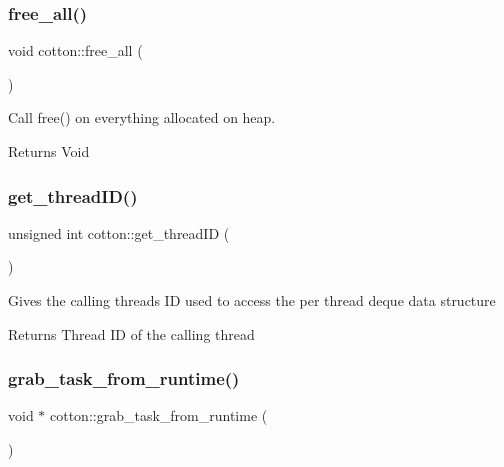 \subsubsection{\texorpdfstring{free\+\_\+all()}{free\_all()}}
{\footnotesize\ttfamily void cotton\+::free\+\_\+all (\begin{DoxyParamCaption}{ }\end{DoxyParamCaption})}

Call free() on everything allocated on heap.

\begin{DoxyReturn}{Returns}
Void 
\end{DoxyReturn}
\mbox{\label{cotton-runtime_8h_file_ab1ebe1f6821a54e7c4911c22acebff8a}} 
\subsubsection{\texorpdfstring{get\+\_\+thread\+I\+D()}{get\_threadID()}}
{\footnotesize\ttfamily unsigned int cotton\+::get\+\_\+thread\+ID (\begin{DoxyParamCaption}{ }\end{DoxyParamCaption})}

Gives the calling thread\textquotesingle{}s ID used to access the per thread deque data structure

\begin{DoxyReturn}{Returns}
Thread ID of the calling thread 
\end{DoxyReturn}
\mbox{\label{cotton-runtime_8h_file_a1cae25b77bd884fcdcf2532663056d22}} 
\subsubsection{\texorpdfstring{grab\+\_\+task\+\_\+from\+\_\+runtime()}{grab\_task\_from\_runtime()}}
{\footnotesize\ttfamily void $\ast$ cotton\+::grab\+\_\+task\+\_\+from\+\_\+runtime (\begin{DoxyParamCaption}{ }\end{DoxyParamCaption})}

